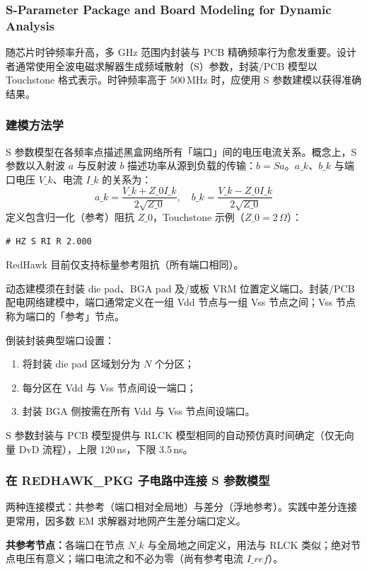 \subsubsection*{S-Parameter Package and Board Modeling for Dynamic Analysis}

随芯片时钟频率升高，多 GHz 范围内封装与 PCB 精确频率行为愈发重要。设计者通常使用全波电磁求解器生成频域散射（S）参数，封装/PCB 模型以 Touchstone 格式表示。时钟频率高于 500\,MHz 时，应使用 S 参数建模以获得准确结果。

\subsubsection{建模方法学}
S 参数模型在各频率点描述黑盒网络所有「端口」间的电压电流关系。概念上，S 参数以入射波 $a$ 与反射波 $b$ 描述功率从源到负载的传输：$b = Sa$。$a\_k$、$b\_k$ 与端口电压 $V\_k$、电流 $I\_k$ 的关系为：
\[
a\_k = \frac{V\_k + Z\_0 I\_k}{2\sqrt{Z\_0}}, \quad
b\_k = \frac{V\_k - Z\_0 I\_k}{2\sqrt{Z\_0}}
\]
定义包含归一化（参考）阻抗 $Z\_0$，Touchstone 示例（$Z\_0=2\,\Omega$）：
\begin{lstlisting}
# HZ S RI R 2.000
\end{lstlisting}
RedHawk 目前仅支持标量参考阻抗（所有端口相同）。

动态建模须在封装 die pad、BGA pad 及/或板 VRM 位置定义端口。封装/PCB 配电网络建模中，端口通常定义在一组 Vdd 节点与一组 Vss 节点之间；Vss 节点称为端口的「参考」节点。

倒装封装典型端口设置：
\begin{enumerate}
  \item 将封装 die pad 区域划分为 $N$ 个分区；
  \item 每分区在 Vdd 与 Vss 节点间设一端口；
  \item 封装 BGA 侧按需在所有 Vdd 与 Vss 节点间设端口。
\end{enumerate}

S 参数封装与 PCB 模型提供与 RLCK 模型相同的自动预仿真时间确定（仅无向量 DvD 流程），上限 120\,ns，下限 3.5\,ns。

\subsubsection{在 REDHAWK\_PKG 子电路中连接 S 参数模型}
两种连接模式：共参考（端口相对全局地）与差分（浮地参考）。实践中差分连接更常用，因多数 EM 求解器对地网产生差分端口定义。

\textbf{共参考节点：}各端口在节点 $N\_k$ 与全局地之间定义，用法与 RLCK 类似；绝对节点电压有意义；端口电流之和不必为零（尚有参考电流 $I\_{ref}$）。

